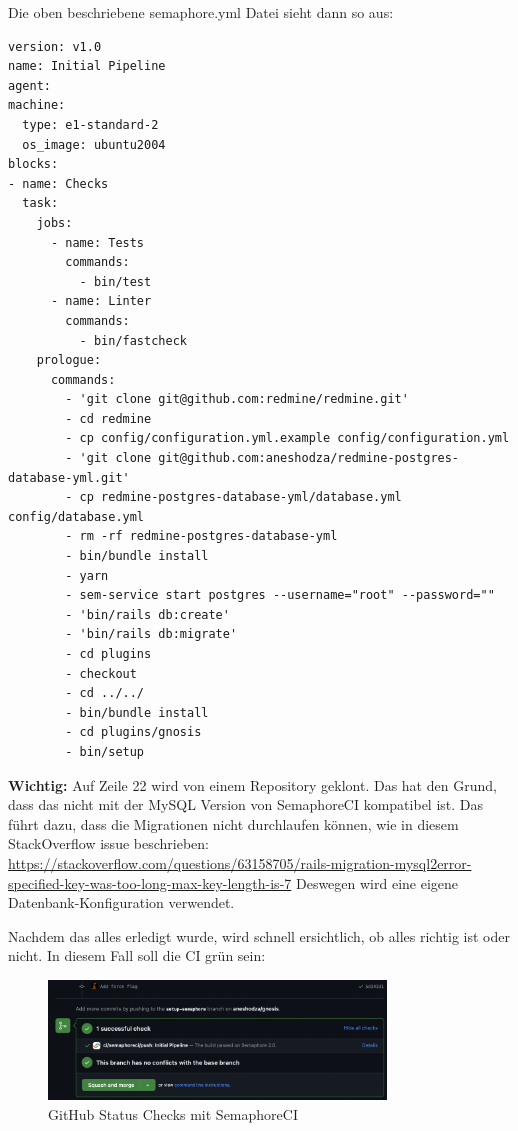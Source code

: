 Die oben beschriebene semaphore.yml Datei sieht dann so aus:
\begin{codebox}[]
  \begin{verbatim}
version: v1.0
name: Initial Pipeline
agent:
machine:
  type: e1-standard-2
  os_image: ubuntu2004
blocks:
- name: Checks
  task:
    jobs:
      - name: Tests
        commands:
          - bin/test
      - name: Linter
        commands:
          - bin/fastcheck
    prologue:
      commands:
        - 'git clone git@github.com:redmine/redmine.git'
        - cd redmine
        - cp config/configuration.yml.example config/configuration.yml
        - 'git clone git@github.com:aneshodza/redmine-postgres-database-yml.git'
        - cp redmine-postgres-database-yml/database.yml config/database.yml
        - rm -rf redmine-postgres-database-yml
        - bin/bundle install
        - yarn
        - sem-service start postgres --username="root" --password=""
        - 'bin/rails db:create'
        - 'bin/rails db:migrate'
        - cd plugins
        - checkout
        - cd ../../
        - bin/bundle install
        - cd plugins/gnosis
        - bin/setup
  \end{verbatim}
\end{codebox}
\textbf{Wichtig:} Auf Zeile 22 wird von einem Repository geklont. Das hat den Grund, dass das
 nicht mit der MySQL Version von SemaphoreCI kompatibel ist. Das führt dazu,
dass die Migrationen nicht durchlaufen können, wie in diesem StackOverflow issue beschrieben: \newline
\url{https://stackoverflow.com/questions/63158705/rails-migration-mysql2error-specified-key-was-too-long-max-key-length-is-7}
\newline
Deswegen wird eine eigene Datenbank-Konfiguration verwendet.

Nachdem das alles erledigt wurde, wird schnell ersichtlich, ob alles richtig ist oder nicht. In diesem Fall soll die CI
grün sein:
\begin{figure}[H]
  \centering
  \includegraphics[width=0.8\textwidth]{images/misc/ci-passed.png}
  \caption[Screenshot des GitHub Status Checks, worauf SemaphoreCI sichtbar ist]{GitHub Status Checks mit SemaphoreCI}
  \label{fig:semaphore_ci_passed}
\end{figure}

